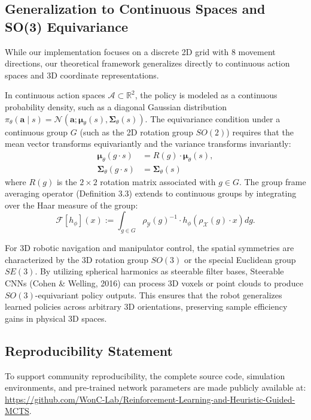 \documentclass{article}
\begin{document}
\subsection{Generalization to Continuous Spaces and SO(3) Equivariance}
While our implementation focuses on a discrete 2D grid with 8 movement directions, our theoretical framework generalizes directly to continuous action spaces and 3D coordinate representations.

In continuous action spaces $\mathcal{A} \subset \mathbb{R}^2$, the policy is modeled as a continuous probability density, such as a diagonal Gaussian distribution $\pi_\theta(\mathbf{a} \mid s) = \mathcal{N}(\mathbf{a}; \boldsymbol{\mu}_\theta(s), \boldsymbol{\Sigma}_\theta(s))$. The equivariance condition under a continuous group $G$ (such as the 2D rotation group $SO(2)$) requires that the mean vector transforms equivariantly and the variance transforms invariantly:
\begin{align}
    \boldsymbol{\mu}_\theta(g \cdot s) &= R(g) \cdot \boldsymbol{\mu}_\theta(s), \\
    \boldsymbol{\Sigma}_\theta(g \cdot s) &= \boldsymbol{\Sigma}_\theta(s)
\end{align}
where $R(g)$ is the $2 \times 2$ rotation matrix associated with $g \in G$. The group frame averaging operator (Definition 3.3) extends to continuous groups by integrating over the Haar measure of the group:
\begin{equation}
    \mathcal{F}[h_\phi](x) := \int_{g \in G} \rho_\mathcal{Y}(g)^{-1} \cdot h_\phi\!\left(\rho_\mathcal{X}(g) \cdot x\right) dg.
\end{equation}

For 3D robotic navigation and manipulator control, the spatial symmetries are characterized by the 3D rotation group $SO(3)$ or the special Euclidean group $SE(3)$. By utilizing spherical harmonics as steerable filter bases, Steerable CNNs (Cohen \& Welling, 2016) can process 3D voxels or point clouds to produce $SO(3)$-equivariant policy outputs. This ensures that the robot generalizes learned policies across arbitrary 3D orientations, preserving sample efficiency gains in physical 3D spaces.

\subsection{Reproducibility Statement}
To support community reproducibility, the complete source code, simulation environments, and pre-trained network parameters are made publicly available at: \url{https://github.com/WonC-Lab/Reinforcement-Learning-and-Heuristic-Guided-MCTS}.
\end{document}
